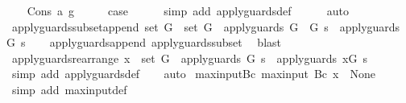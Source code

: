\begin{isabellebody}
\isanewline
\ \ \isamarkupfalse%
\ {\isacharparenleft}Cons\ a\ g{\isacharparenright}\isanewline
\ \ \isamarkupfalse%
\ \isamarkupfalse%
\ {\isacharquery}case\isanewline
\ \ \ \ \isamarkupfalse%
\ {\isacharparenleft}simp\ add{\isacharcolon}\ apply{\isacharunderscore}guards{\isacharunderscore}def{\isacharparenright}\isanewline
\ \ \ \ \isamarkupfalse%
\ auto\isanewline
{}\isamarkupfalse%
%
\endisatagproof
{\isafoldproof}%
%
\isadelimproof
\isanewline
%
\endisadelimproof
\isanewline
{}\isamarkupfalse%
\ apply{\isacharunderscore}guards{\isacharunderscore}subset{\isacharunderscore}append{\isacharcolon}\ {\isachardoublequoteopen}set\ G\ {\isasymsubseteq}\ set\ G{\isacharprime}\ {\isasymLongrightarrow}\ apply{\isacharunderscore}guards\ {\isacharparenleft}G\ {\isacharat}\ G{\isacharprime}{\isacharparenright}\ s\ {\isacharequal}\ apply{\isacharunderscore}guards\ {\isacharparenleft}G{\isacharprime}{\isacharparenright}\ s{\isachardoublequoteclose}\isanewline
%
\isadelimproof
\ \ %
\endisadelimproof
%
\isatagproof
{}\isamarkupfalse%
\ apply{\isacharunderscore}guards{\isacharunderscore}append\ apply{\isacharunderscore}guards{\isacharunderscore}subset\ \isamarkupfalse%
\ blast%
\endisatagproof
{\isafoldproof}%
%
\isadelimproof
\isanewline
%
\endisadelimproof
\isanewline
{}\isamarkupfalse%
\ apply{\isacharunderscore}guards{\isacharunderscore}rearrange{\isacharcolon}\ {\isachardoublequoteopen}x\ {\isasymin}\ set\ G\ {\isasymLongrightarrow}\ apply{\isacharunderscore}guards\ G\ s\ {\isacharequal}\ apply{\isacharunderscore}guards\ {\isacharparenleft}x{\isacharhash}G{\isacharparenright}\ s{\isachardoublequoteclose}\isanewline
%
\isadelimproof
\ \ %
\endisadelimproof
%
\isatagproof
{}\isamarkupfalse%
\ {\isacharparenleft}simp\ add{\isacharcolon}\ apply{\isacharunderscore}guards{\isacharunderscore}def{\isacharparenright}\isanewline
\ \ \isamarkupfalse%
\ auto%
\endisatagproof
{\isafoldproof}%
%
\isadelimproof
\isanewline
%
\endisadelimproof
\isanewline
{}\isamarkupfalse%
\ max{\isacharunderscore}input{\isacharunderscore}Bc{\isacharcolon}\ {\isachardoublequoteopen}max{\isacharunderscore}input\ {\isacharparenleft}Bc\ x{\isacharparenright}\ {\isacharequal}\ None{\isachardoublequoteclose}\isanewline
%
\isadelimproof
\ \ %
\endisadelimproof
%
\isatagproof
{}\isamarkupfalse%
\ {\isacharparenleft}simp\ add{\isacharcolon}\ max{\isacharunderscore}input{\isacharunderscore}def{\isacharparenright}%

\end{isabellebody}
